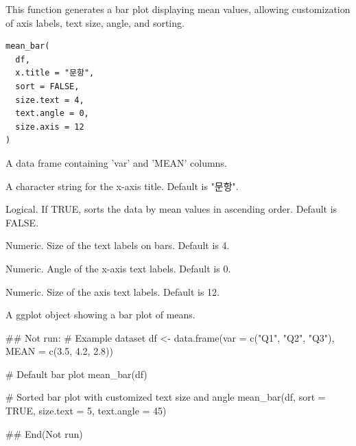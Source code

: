 \documentclass[a4paper]{book}
\begin{document}
%
\begin{Description}
This function generates a bar plot displaying mean values, allowing customization of axis labels, text size, angle, and sorting.
\end{Description}
%
\begin{Usage}
\begin{verbatim}
mean_bar(
  df,
  x.title = "문항",
  sort = FALSE,
  size.text = 4,
  text.angle = 0,
  size.axis = 12
)
\end{verbatim}
\end{Usage}
%
\begin{Arguments}
\begin{ldescription}
\item[\code{df}] A data frame containing 'var' and 'MEAN' columns.

\item[\code{x.title}] A character string for the x-axis title. Default is "문항".

\item[\code{sort}] Logical. If TRUE, sorts the data by mean values in ascending order. Default is FALSE.

\item[\code{size.text}] Numeric. Size of the text labels on bars. Default is 4.

\item[\code{text.angle}] Numeric. Angle of the x-axis text labels. Default is 0.

\item[\code{size.axis}] Numeric. Size of the axis text labels. Default is 12.
\end{ldescription}
\end{Arguments}
%
\begin{Value}
A ggplot object showing a bar plot of means.
\end{Value}
%
\begin{Examples}
\begin{ExampleCode}
\#\# Not run: 
# Example dataset
df <- data.frame(var = c("Q1", "Q2", "Q3"), MEAN = c(3.5, 4.2, 2.8))

# Default bar plot
mean_bar(df)

# Sorted bar plot with customized text size and angle
mean_bar(df, sort = TRUE, size.text = 5, text.angle = 45)

## End(Not run)
\end{ExampleCode}
\end{Examples}
\end{document}
